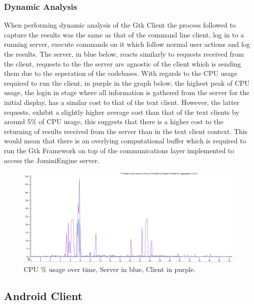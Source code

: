 \documentclass{article}
\begin{document}
\subsubsection{Dynamic Analysis}
When performing dynamic analysis of the Gtk Client the process followed to capture the results was the same as that of the command line client, log in to a running server, execute commands on it which follow normal user actions and log the results. The server, in blue below, reacts similarly to requests received from the client, requests to the the server are agnostic of the client which is sending them due to the seperation of the codebases. With regards to the CPU usage required to run the client, in purple in the graph below, the highest peak of CPU usage, the login in stage where all information is gathered from the server for the initial display, has a similar cost to that of the text client. However, the latter requests, exhibit a slightly higher average cost than that of the text clients by around 5\% of CPU usage, this suggests that there is a higher cost to the returning of results received from the server than in the text client context. This would mean that there is an overlying computational buffer which is required to run the Gtk Framework on top of the communications layer implemented to access the JominiEngine server.
\begin{figure}[H]
	\caption{CPU \% usage over time, Server in blue, Client in purple.}
	\begin{center}
		\includegraphics[width=\textwidth]{gtkclientgraph.PNG}
	\end{center}
\end{figure}
\subsection{Android Client}
\end{document}
